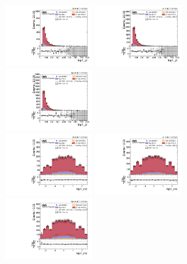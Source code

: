\begin{figure}[!ht]
  \centering
  \includegraphics[width=0.335\textwidth]{analysis_plots/2016_zjj/cr_vjets_e/lep1_pt.pdf} \hspace{-10pt}
  \includegraphics[width=0.335\textwidth]{analysis_plots/2017_zjj/cr_vjets_e/lep1_pt.pdf} \hspace{-10pt}
  \includegraphics[width=0.335\textwidth]{analysis_plots/2018_zjj/cr_vjets_e/lep1_pt.pdf} \hspace{-10pt} \\
  \includegraphics[width=0.335\textwidth]{analysis_plots/2016_zjj/cr_vjets_e/lep1_eta.pdf} \hspace{-10pt}
  \includegraphics[width=0.335\textwidth]{analysis_plots/2017_zjj/cr_vjets_e/lep1_eta.pdf} \hspace{-10pt}
  \includegraphics[width=0.335\textwidth]{analysis_plots/2018_zjj/cr_vjets_e/lep1_eta.pdf} \hspace{-10pt} \\

\end{figure}
